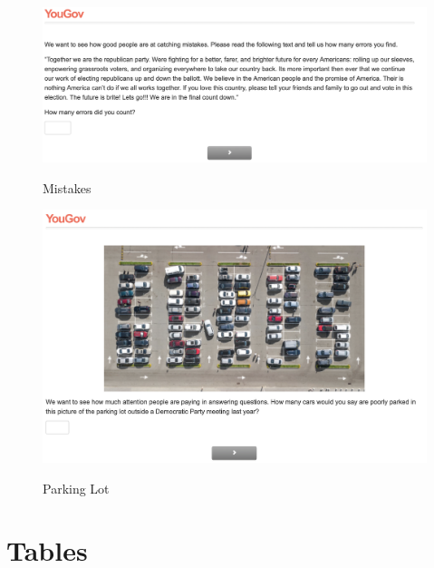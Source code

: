 \documentclass[12pt, letterpaper]{article}
\begin{document}
\begin{figure}[!htbp]
\centering
\caption{Mistakes}
\includegraphics[scale=.4]{../data/treats/Mistakes_Rep.png}
\label{fig:mistakes_rep}
\end{figure}

\begin{figure}[!htbp]
\centering
\caption{Parking Lot}
\includegraphics[scale=.4]{../data/treats/Parking_Lot_Dems.png}
\label{fig:mistakes_rep}
\end{figure}

\clearpage
\section{Tables}


\end{document}
